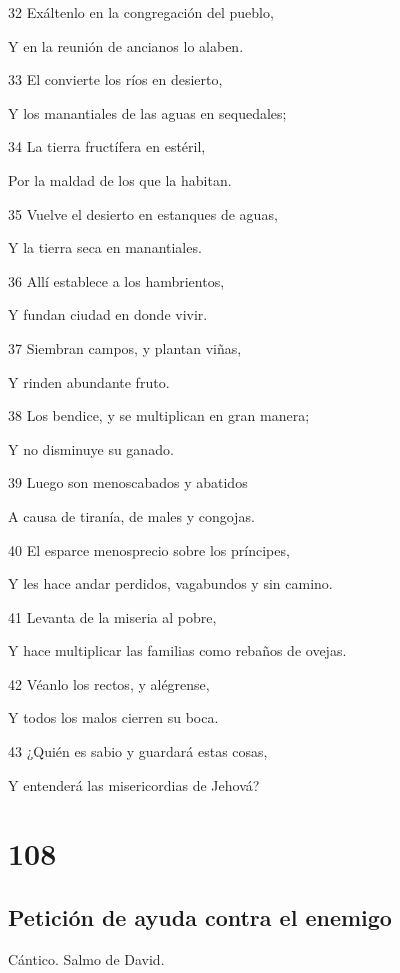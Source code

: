 \par 32 Exáltenlo en la congregación del pueblo,
\par Y en la reunión de ancianos lo alaben.
\par 33 El convierte los ríos en desierto,
\par Y los manantiales de las aguas en sequedales;
\par 34 La tierra fructífera en estéril,
\par Por la maldad de los que la habitan.
\par 35 Vuelve el desierto en estanques de aguas,
\par Y la tierra seca en manantiales.
\par 36 Allí establece a los hambrientos,
\par Y fundan ciudad en donde vivir.
\par 37 Siembran campos, y plantan viñas,
\par Y rinden abundante fruto.
\par 38 Los bendice, y se multiplican en gran manera;
\par Y no disminuye su ganado.
\par 39 Luego son menoscabados y abatidos
\par A causa de tiranía, de males y congojas.
\par 40 El esparce menosprecio sobre los príncipes,
\par Y les hace andar perdidos, vagabundos y sin camino.
\par 41 Levanta de la miseria al pobre,
\par Y hace multiplicar las familias como rebaños de ovejas.
\par 42 Véanlo los rectos, y alégrense,
\par Y todos los malos cierren su boca.
\par 43 ¿Quién es sabio y guardará estas cosas,
\par Y entenderá las misericordias de Jehová?

\chapter{108}

\section*{Petición de ayuda contra el enemigo}

\par Cántico. Salmo de David.

